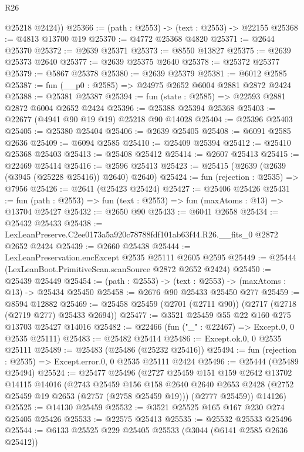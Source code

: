 \begin{lexlean}{R26}
\begin{coremodule}
        @25218
        @2424))
@25366 := (path : @2553) -> (text : @2553) -> @22155
@25368 := @4813 @13700 @19
@25370 := @4772 @25368 @4820
@25371 := @2644 @25370
@25372 := @2639 @25371
@25373 := @8550 @13827
@25375 := @2639 @25373 @2640
@25377 := @2639 @25375 @2640
@25378 := @25372 @25377
@25379 := @5867 @25378
@25380 := @2639 @25379
@25381 := @6012 @2585
@25387 := fun (__p0 : @2585) => @24975 @2652 @6004 @2881 @2872 @2424
@25388 := @25381 @25387
@25394 := fun (state : @2585) => @22593 @2881 @2872 @6004 @2652 @2424
@25396 := @25388 @25394 @25368
@25403 := @22677 (@4941 @90 @19 @19) @25218 @90 @14028
@25404 := @25396 @25403
@25405 := @25380 @25404
@25406 := @2639 @25405
@25408 := @6091 @2585 @2636
@25409 := @6094 @2585
@25410 := @25409 @25394
@25412 := @25410 @25368 @25403
@25413 := @25408 @25412
@25414 := @2607 @25413
@25415 := @22469 @25414
@25416 := @2596 @25413
@25423 := @25415 (@2639 (@2639 (@3945 (@25228 @25416)) @2640) @2640)
@25424 := fun (rejection : @2535) => @7956
@25426 := @2641 (@25423 @25424)
@25427 := @25406 @25426
@25431 := fun (path : @2553) => fun (text : @2553) => fun (maxAtoms : @13) => @13704 @25427
@25432 := @2650 @90
@25433 := @6041 @2658
@25434 := @25432 @25433
@25438 := LexLeanPreserve.C2ee0173a5a920c78788fdf101ab63f44.R26.__fits_0 @2872 @2652 @2424
@25439 := @2660 @25438
@25444 := LexLeanPreservation.encExcept @2535 @25111 @2605 @2595
@25449 := @25444 (LexLeanBoot.PrimitiveScan.scanSource @2872 @2652 @2424)
@25450 := @25439 @25449
@25454 := (path : @2553) -> (text : @2553) -> (maxAtoms : @13) -> @25434 @25450
@25458 := @2676 @90 @25433 @25450 @277
@25459 := @8594 @12882
@25469 := @25458 @25459 (@2701 (@2711 @90)) (@2717 (@2718 (@2719 @277) @25433 @2694))
@25477 := @3521 @25459 @55 @22 @160 @275 @13703 @25427 @14016
@25482 := @22466 (fun ("_" : @22467) => Except.{0, 0} @2535 @25111)
@25483 := @25482 @25414
@25486 := Except.ok.{0, 0} @2535 @25111
@25489 := @25483 (@25486 (@25232 @25416))
@25494 := fun (rejection : @2535) => Except.error.{0, 0} @2535 @25111 @2424
@25496 := @25444 (@25489 @25494)
@25524 := @25477
    @25496
    (@2727
      @25459
      @151
      @159
      @2642
      @13702
      @14115
      @14016
      (@2743
        @25459
        @156
        @158
        @2640
        @2640
        @2653
        @2428
        (@2752 @25459 @19 @2653 (@2757 (@2758 @25459 @19)))
        (@2777 @25459))
      @14126)
@25525 := @14130 @25459
@25532 := @3521 @25525 @165 @167 @230 @274 @25405 @25426
@25533 := @22575 @25413
@25535 := @25532 @25533 @25496
@25544 := @6133 @25525 @229 @25405 @25533 (@3044 (@6141 @2585 @2636 @25412))

\end{coremodule}
\end{lexlean}
